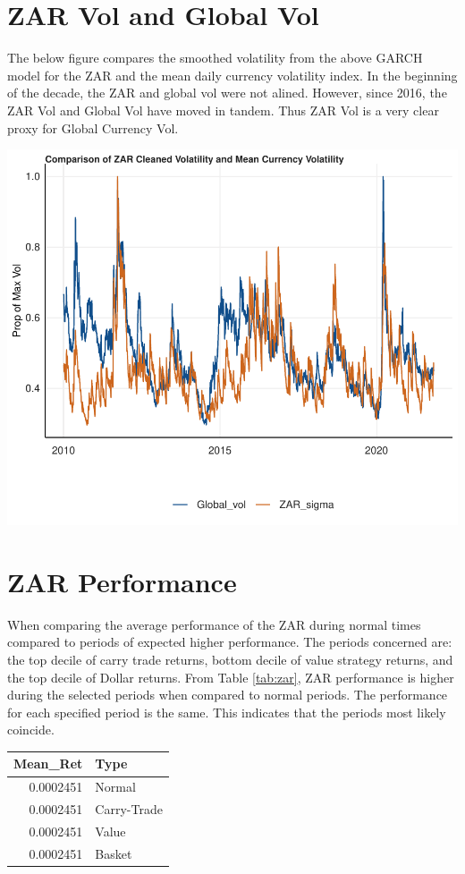 \documentclass[11pt,preprint, authoryear]{elsarticle}
\let\origtable\table
\let\endorigtable\endtable
\renewenvironment{table}[1][2] {
    \expandafter\origtable\expandafter[H]
} {
    \endorigtable
}
\numberwithin{equation}{section}
\numberwithin{figure}{section}
\numberwithin{table}{section}
\begin{document}
\hypertarget{zar-vol-and-global-vol}{%
\section{ZAR Vol and Global Vol}\label{zar-vol-and-global-vol}}

The below figure compares the smoothed volatility from the above GARCH
model for the ZAR and the mean daily currency volatility index. In the
beginning of the decade, the ZAR and global vol were not alined.
However, since 2016, the ZAR Vol and Global Vol have moved in tandem.
Thus ZAR Vol is a very clear proxy for Global Currency Vol.

\includegraphics{Question4_files/figure-latex/q4_4-1.pdf}

\hypertarget{zar-performance}{%
\section{ZAR Performance}\label{zar-performance}}

When comparing the average performance of the ZAR during normal times
compared to periods of expected higher performance. The periods
concerned are: the top decile of carry trade returns, bottom decile of
value strategy returns, and the top decile of Dollar returns. From Table
\ref{tab:zar}, ZAR performance is higher during the selected periods
when compared to normal periods. The performance for each specified
period is the same. This indicates that the periods most likely
coincide.

\begin{table}

\caption{\label{tab:zar}ZAR Performance during Different Periods}
\centering
\begin{tabular}[t]{r|l}
\hline
Mean\_Ret & Type\\
\hline
0.0002451 & Normal\\
\hline
0.0002451 & Carry-Trade\\
\hline
0.0002451 & Value\\
\hline
0.0002451 & Basket\\
\hline
\end{tabular}
\end{table}


\end{document}
